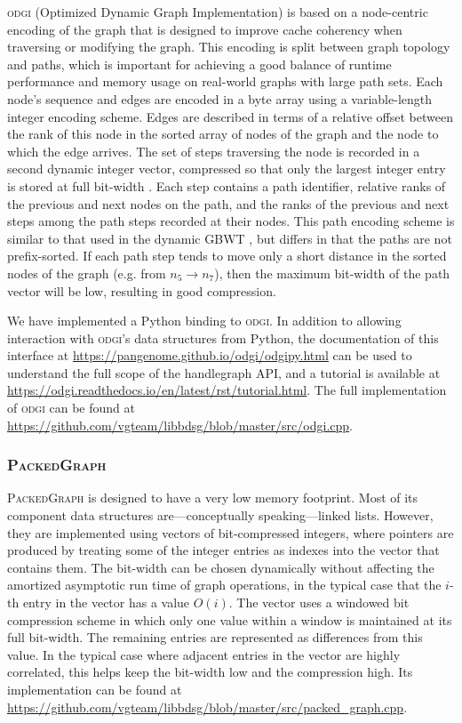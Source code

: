 \documentclass{article}
\begin{document}
\textsc{odgi} (Optimized Dynamic Graph Implementation) is based on a node-centric encoding of the graph that is designed to improve cache coherency when traversing or modifying the graph.
This encoding is split between graph topology and paths, which is important for achieving a good balance of runtime performance and memory usage on real-world graphs with large path sets.
Each node's sequence and edges are encoded in a byte array using a variable-length integer encoding scheme.
Edges are described in terms of a relative offset between the rank of this node in the sorted array of nodes of the graph and the node to which the edge arrives.
The set of steps traversing the node is recorded in a second dynamic integer vector, compressed so that only the largest integer entry is stored at full bit-width \cite{prezza2017framework}.
Each step contains a path identifier, relative ranks of the previous and next nodes on the path, and the ranks of the previous and next steps among the path steps recorded at their nodes.
This path encoding scheme is similar to that used in the dynamic GBWT \cite{Siren_2019}, but differs in that the paths are not prefix-sorted.
If each path step tends to move only a short distance in the sorted nodes of the graph (e.g. from $n_{5} \to n_{7}$), then the maximum bit-width of the path vector will be low, resulting in good compression.

We have implemented a Python binding to \textsc{odgi}. 
In addition to allowing interaction with \textsc{odgi}'s data structures from Python, the documentation of this interface at \url{https://pangenome.github.io/odgi/odgipy.html} can be used to understand the full scope of the handlegraph API, and a tutorial is available at \url{https://odgi.readthedocs.io/en/latest/rst/tutorial.html}.
The full implementation of \textsc{odgi} can be found at \url{https://github.com/vgteam/libbdsg/blob/master/src/odgi.cpp}.

\subsubsection{\textsc{PackedGraph}}

\textsc{PackedGraph} is designed to have a very low memory footprint.
Most of its component data structures are---conceptually speaking---linked lists.
However, they are implemented using vectors of bit-compressed integers, where pointers are produced by treating some of the integer entries as indexes into the vector that contains them.
The bit-width can be chosen dynamically without affecting the amortized asymptotic run time of graph operations, in the typical case that the $i$-th entry in the vector has a value $O(i)$.
The vector uses a windowed bit compression scheme in which only one value within a window is maintained at its full bit-width.
The remaining entries are represented as differences from this value.
In the typical case where adjacent entries in the vector are highly correlated, this helps keep the bit-width low and the compression high.
Its implementation can be found at \url{https://github.com/vgteam/libbdsg/blob/master/src/packed_graph.cpp}.
\end{document}

